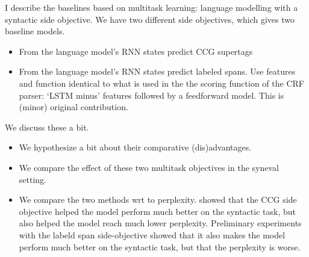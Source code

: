 I describe the baselines based on multitask learning: language modelling with a syntactic side objective. We have two different side objectives, which gives two baseline models.
\begin{itemize}
  \item From the language model's RNN states predict CCG supertags  \citep{Enguehard+2017:RNN-multitask}
  \item From the language model's RNN states predict labeled spans. Use features and function identical to what is used in the the scoring function of the CRF parser: `LSTM minus' features followed by a feedforward model. This is (minor) original contribution.
\end{itemize}

We discuss these a bit.
\begin{itemize}
  \item We hypothesize a bit about their comparative (dis)advantages.
  \item We compare the effect of these two multitask objectives in the syneval setting.
  \item We compare the two methods wrt to perplexity. \cite{Enguehard+2017:RNN-multitask} showed that the CCG side objective helped the model perform much better on the syntactic task, but also helped the model reach much lower perplexity. Preliminary experiments with the labeld span side-objective showed that it also makes the model perform much better on the syntactic task, but that the perplexity is worse.
\end{itemize}

